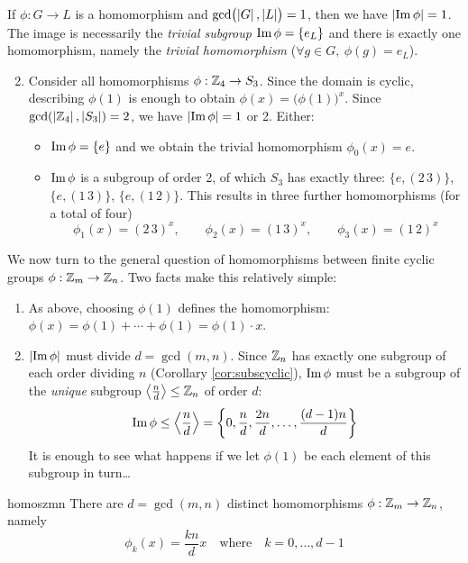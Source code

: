 \goodbreak


\begin{examples}{}{}
	\exstart If $\phi:G\to L$ is a homomorphism and $\gcd\bigl(\left| G\right|,\left| L\right|\bigr)=1$, then we have $\left| \operatorname{Im}\phi\right|=1$. The image is necessarily the \emph{trivial subgroup} $\operatorname{Im}\phi=\{e_L\}$ and there is exactly one homomorphism, namely the \emph{trivial homomorphism} ($\forall g\in G,\ \phi(g)=e_L$).\vspace{-2pt}
	\begin{enumerate}\setcounter{enumi}{1}
	  \item Consider all homomorphisms $\phi:\mathbb{Z}_4\to S_3$. Since the domain is cyclic, describing $\phi(1)$ is enough to obtain $\phi(x)=\bigl(\phi(1)\bigr)^x$. Since $\gcd(\left| \mathbb{Z}_4\right|,\left| S_3\right|)=2$, we have $\left| \operatorname{Im}\phi\right|=1$ or 2. Either:
	  \begin{itemize}
	    \item $\operatorname{Im}\phi=\{e\}$ and we obtain the trivial homomorphism $\phi_0(x)=e$.
	    \item $\operatorname{Im}\phi$ is a subgroup of order 2, of which $S_3$ has exactly three: $\{e,(2\,3)\}$, $\{e,(1\,3)\}$, $\{e,(1\,2)\}$. This results in three further homomorphisms (for a total of four)
	  \[
	  	\phi_1(x)=(2\,3)^x,\qquad 
	  	\phi_2(x)=(1\,3)^x,\qquad
	  	\phi_3(x)=(1\,2)^x
	  \]
	  \end{itemize}
	\end{enumerate}
\end{examples}

We now turn to the general question of homomorphisms between finite cyclic groups $\phi:\mathbb{Z}_m\to\mathbb{Z}_n$. Two facts make this relatively simple:
\begin{enumerate}\itemsep2pt
  \item As above, choosing $\phi(1)$ defines the homomorphism: $\phi(x)=\phi(1)+\cdots+\phi(1)=\phi(1)\cdot x$.
  \item $\left| \operatorname{Im}\phi\right|$ must divide $d=\gcd(m,n)$. Since $\mathbb{Z}_n$ has exactly one subgroup of each order dividing $n$ (Corollary \ref{cor:subscyclic}), $\operatorname{Im}\phi$ must be a subgroup of the \emph{unique} subgroup $\left\langle \frac nd\right\rangle\le\mathbb{Z}_n$ of order $d$:
	\[
		\operatorname{Im}\phi\le\left\langle \frac nd\right\rangle
		=\left\{0,\frac nd,\frac{2n}d,\ldots,\frac{(d-1)n}d\right\}
	\]
	It is enough to see what happens if we let $\phi(1)$ be each element of this subgroup in turn\ldots
\end{enumerate} 

\begin{cor}{}{homoszmn}
	There are $d=\gcd(m,n)$ distinct homomorphisms $\phi:\mathbb{Z}_m\to\mathbb{Z}_n$, namely
	\[
		\phi_k(x)=\frac{kn}{d}x
		\quad\text{where}\quad 
		k=0,\ldots,d-1
	\]
\end{cor}

